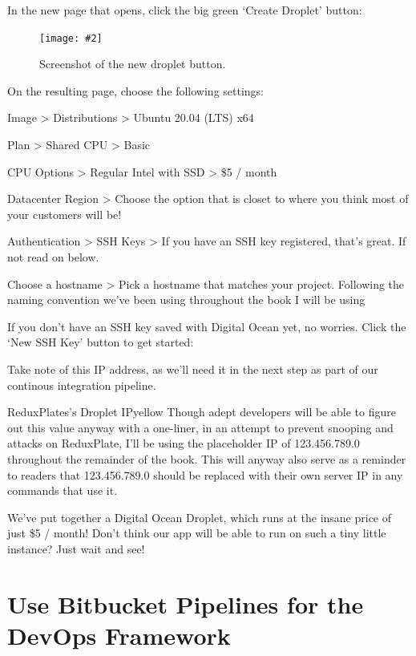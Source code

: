 \documentclass[paper=6in:9in,pagesize=pdftex,headinclude=on,footinclude=on,12pt,twoside]{scrbook}
\newcommand{\standardfigure}[3]{\begin{figure}[H]\begin{center}\texttt{[image: \#2]}\caption{#3}\label{fig:#2}\end{center}\end{figure}}
\begin{document}
In the new page that opens, click the big green `Create Droplet' button:

\standardfigure{\textwidth}{droplet/new-droplet}{Screenshot of the new droplet button.}

On the resulting page, choose the following settings:

\begin{arrows}
\item Image > Distributions > Ubuntu 20.04 (LTS) x64
\item Plan > Shared CPU > Basic
\item CPU Options > Regular Intel with SSD > \$5 / month
\item Datacenter Region > Choose the option that is closet to where you think most of your customers will be!
\item Authentication > SSH Keys > If you have an SSH key registered, that's great. If not read on below.
\item Choose a hostname > Pick a hostname that matches your project. Following the naming convention we've been using throughout the book I will be using 
\end{arrows}


If you don't have an SSH key saved with Digital Ocean yet, no worries. Click the `New SSH Key' button to get started:

Take note of this IP address, as we'll need it in the next step as part of our continous integration pipeline.

\begin{highlightBox}{ReduxPlates's Droplet IP}{yellow}{\warning}
Though adept developers will be able to figure out this value anyway with a one-liner, in an attempt to prevent snooping and attacks on ReduxPlate, I'll be using the placeholder IP of 123.456.789.0 throughout the remainder of the book. This will anyway also serve as a reminder to readers that 123.456.789.0 should be replaced with their own server IP in any commands that use it.
\end{highlightBox}


We've put together a Digital Ocean Droplet, which runs at the insane price of just \$5 / month! Don't think our app will be able to run on such a tiny little instance? Just wait and see!

\section{Use Bitbucket Pipelines for the DevOps Framework}
\end{document}
